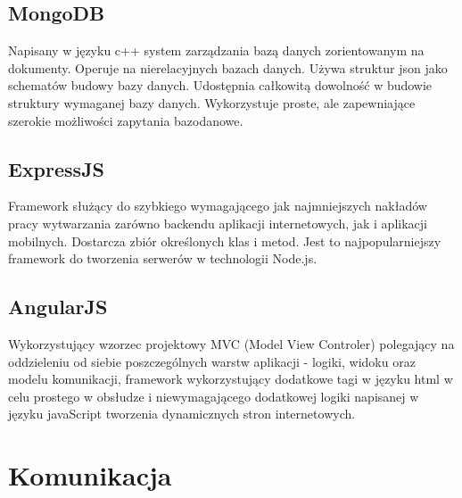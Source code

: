\documentclass[12pt]{report}
\begin{document}
\subsection{MongoDB}
Napisany w języku c++ system zarządzania bazą danych zorientowanym na dokumenty. 
Operuje na nierelacyjnych bazach danych. 
Używa struktur json jako schematów budowy bazy danych.
Udostępnia całkowitą dowolność w budowie struktury wymaganej bazy danych. 
Wykorzystuje proste, ale zapewniające szerokie możliwości zapytania bazodanowe.

\subsection{ExpressJS }
Framework służący do szybkiego wymagającego jak najmniejszych nakładów pracy wytwarzania zarówno backendu aplikacji internetowych, jak i aplikacji mobilnych.
Dostarcza zbiór określonych klas i metod. Jest to najpopularniejszy framework do tworzenia serwerów w technologii Node.js.

\subsection{AngularJS}
Wykorzystujący wzorzec projektowy MVC (Model View Controler) polegający na oddzieleniu od siebie poszczególnych warstw aplikacji - logiki, widoku oraz modelu komunikacji, framework wykorzystujący dodatkowe tagi w języku html w celu prostego w obsłudze i niewymagającego dodatkowej logiki napisanej w języku javaScript tworzenia dynamicznych stron internetowych.

\section{Komunikacja}
\end{document}
